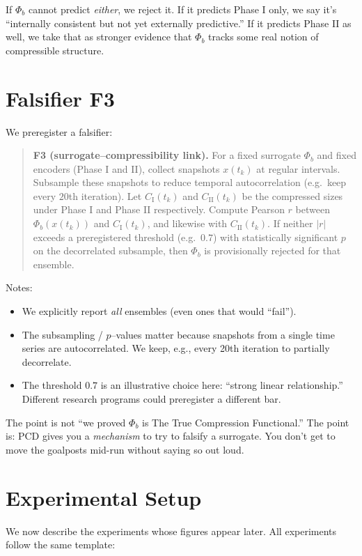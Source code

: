 \documentclass[11pt,a4paper]{article}
\numberwithin{equation}{section}
\newcommand{\phib}{\Phi_b}
\begin{document}
If $\phib$ cannot predict \emph{either}, we reject it. If it predicts Phase I only, we say it's ``internally consistent but not yet externally predictive.'' If it predicts Phase II as well, we take that as stronger evidence that $\phib$ tracks some real notion of compressible structure.

\section{Falsifier F3}
We preregister a falsifier:

\begin{quote}
\textbf{F3 (surrogate--compressibility link).} For a fixed surrogate $\phib$ and fixed encoders (Phase I and II), collect snapshots $x(t_k)$ at regular intervals. Subsample these snapshots to reduce temporal autocorrelation (e.g.\ keep every $20$th iteration). Let $C_{\text{I}}(t_k)$ and $C_{\text{II}}(t_k)$ be the compressed sizes under Phase I and Phase II respectively. Compute Pearson $r$ between $\phib(x(t_k))$ and $C_{\text{I}}(t_k)$, and likewise with $C_{\text{II}}(t_k)$. If neither $|r|$ exceeds a preregistered threshold (e.g.\ $0.7$) with statistically significant $p$ on the decorrelated subsample, then $\phib$ is provisionally rejected for that ensemble.
\end{quote}

Notes:
\begin{itemize}
\item We explicitly report \emph{all} ensembles (even ones that would ``fail'').
\item The subsampling / $p$--values matter because snapshots from a single time series are autocorrelated. We keep, e.g., every 20th iteration to partially decorrelate.
\item The threshold $0.7$ is an illustrative choice here: ``strong linear relationship.'' Different research programs could preregister a different bar.
\end{itemize}

The point is not ``we proved $\phib$ is The True Compression Functional.'' The point is: PCD gives you a \emph{mechanism} to try to falsify a surrogate. You don't get to move the goalposts mid-run without saying so out loud.

\section{Experimental Setup}
We now describe the experiments whose figures appear later. All experiments follow the same template:
\end{document}
